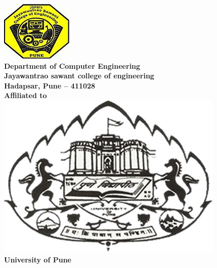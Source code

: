 \begin{center}
\includegraphics[scale=0.5]{project/images/jscoe_logo}\\
\large{\textbf{Department of Computer Engineering}}\\
\LARGE{\textbf{Jayawantrao sawant college of engineering}}\\
\Large{\textbf{Hadapsar, Pune – 411028}}\\[0.5cm]
\Large{\textbf{Affiliated to}}\\[0.5cm]
\includegraphics[scale=5.0]{project/images/uop-logo}\\
\LARGE{\textbf{University of Pune}}
\newpage

\end{center}


